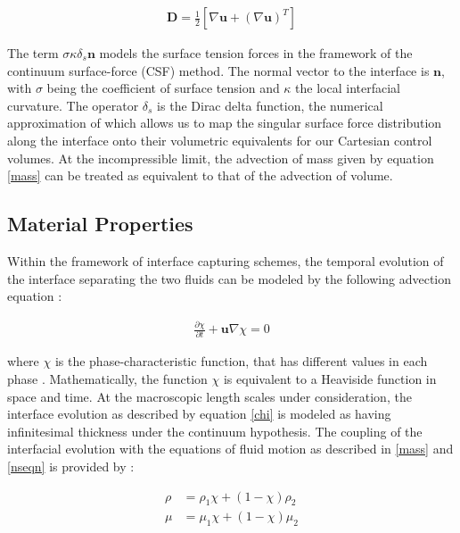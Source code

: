 \begin{align}
	\boldsymbol{D} = \frac{1}{2}\left[\nabla \boldsymbol{u} + \left(\nabla \boldsymbol{u}\right)^{T}\right]  
\end{align}


The term $\sigma \kappa \delta_{s}\boldsymbol{n}$ models the surface tension forces in the 
framework of the continuum surface-force (CSF) method. The normal vector to the interface 
is $\boldsymbol{n}$, with $\sigma$ being the coefficient of surface tension and $\kappa$ the 
local interfacial curvature. The operator $\delta_{s}$ is the Dirac delta function, 
the numerical approximation of which allows us to map the singular surface force distribution
along the interface onto their volumetric equivalents for our Cartesian control volumes. 
At the incompressible limit, the advection of mass given by equation \ref{mass} can be 
treated as equivalent to that of the advection of volume.


\subsection*{Material Properties}
Within the framework of interface capturing schemes, the 
temporal evolution of the interface separating the two fluids
can be modeled by the following advection equation : 

\begin{align} 
	\frac{\partial \chi}{\partial t} + \boldsymbol{u}\nabla\chi = 0 	
\label{chi}
\end{align}

where $\chi$ is the phase-characteristic function, that has different values 
in each phase  . Mathematically, the function $\chi$
is equivalent to a Heaviside function in space and time. 
At the macroscopic length scales under consideration, the interface evolution
as described by equation \ref{chi} is modeled as having infinitesimal thickness
under the continuum hypothesis. The coupling of the interfacial evolution with
the equations of fluid motion as described in \ref{mass} and \ref{nseqn} is provided by :  

\begin{align}
	\rho &= \rho_{1}\chi + \left(1 - \chi\right)\rho_{2} \label {rho_chi} \\ 
	\mu  &= \mu_{1}\chi  + \left(1 - \chi\right)\mu_{2}  
  \label{mu_chi}
\end{align}


